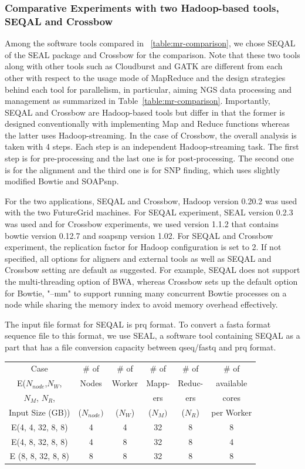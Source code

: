 \documentclass{sig-alternate}
\begin{document}
{\subsubsection{Comparative Experiments with two Hadoop-based tools, SEQAL and Crossbow}
Among the software tools compared in ~\ref{table:mr-comparison}, we chose SEQAL of the SEAL package and Crossbow for the comparison.  Note that these two tools along with other tools such as Cloudburst and GATK are different from each other with respect to the usage mode of MapReduce and the design strategies behind each tool for parallelism, in particular, aiming NGS data processing and management as summarized in Table~\ref{table:mr-comparison}.  Importantly, SEQAL and Crossbow are Hadoop-based tools but differ in that the former is designed conventionally with implementing Map and Reduce functions whereas the latter uses Hadoop-streaming.  In the case of Crossbow, the overall analysis is taken with 4 steps.  Each step is an independent Hadoop-streaming task.  The first step is for pre-processing and the last one is for post-processing. The second one is for the alignment and the third one is for SNP finding, which uses slightly modified Bowtie and SOAPsnp.  

For the two applications, SEQAL and Crossbow, Hadoop version 0.20.2 was used with the two FutureGrid machines.  For SEQAL experiment, SEAL version 0.2.3 was used and for Crossbow experiments, we used version 1.1.2 that contains bowtie version 0.12.7 and soapsnp version 1.02.  For SEQAL and Crossbow experiment, the replication factor for Hadoop configuration is set  to 2.  If not specified, all options for aligners and external tools as well as SEQAL and Crossbow setting are default as suggested.  For example, SEQAL does not support the multi-threading option of BWA, whereas Crossbow sets up the default option for Bowtie, "--mm" to support running many concurrent Bowtie processes on a node while sharing the memory index to avoid memory overhead effectively.  

The input file format for SEQAL is prq format.  To convert a fasta format sequence file to this format, we use SEAL, a software tool containing SEQAL as a part that has a file conversion capacity between qseq/fastq and prq format.  

\begin{table}
\small
 \begin{tabular}{|c|c|c|c|c|c|} 
 \hline 

Case & \# of  & \# of &  \# of & \# of & \# of  \\
E($N_{node}$,$N_W$,  & Nodes & Worker   & Mapp- & Reduc- & available  \\
$N_M$, $N_R$,  & &  & ers & ers & cores \\
Input Size (GB)) & ($N_{node})$& ($N_W$) & ($N_M) $ & ($N_R$) & per Worker \\
 \hline
E(4, 4, 32, 8, 8) &4 &  4 & 32  & 8 & 8 \\
E(4, 8, 32, 8, 8) & 4 & 8 & 32 & 8 & 4 \\
E (8, 8, 32, 8, 8) & 8 & 8 & 32 & 8 & 8 \\ 
 \hline
 \end{tabular}


\end{table}}
\end{document}
